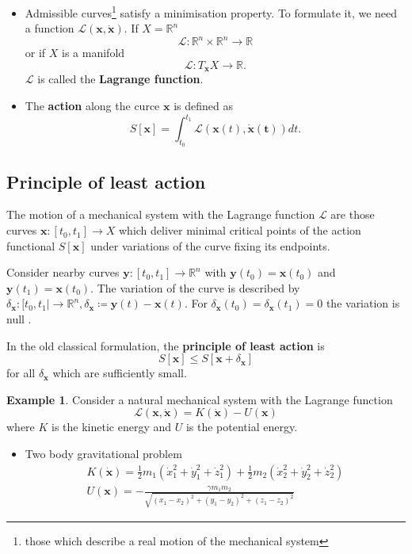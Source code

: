 \documentclass[hidelinks,a4paper, 11pt]{article}
\theoremstyle{plain}
\theoremstyle{break}
\theoremstyle{plain}
\theoremstyle{definition}
\newtheorem*{example}{Example}
\begin{document}
{\begin{itemize}
	\item Admissible curves\footnote{those which describe a real motion of the mechanical system} satisfy a minimisation  property. To formulate it, we need a function $\mathcal L({\mathbf x, \mathbf{\dot x}})$. If $X= \mathbb R^n$
	\[
		\mathcal L: \mathbb R^n \times \mathbb R^n \to \mathbb R 
	\]
	or if $X$ is a manifold
	\[
		\mathcal L: T_{\mathbf x}X \to \mathbb R.
	\]
	$\mathcal L$ is called the \textbf{Lagrange function}.
	
	\item The \textbf{action} along the curce $\mathbf{x}$ is defined as 
	\[
		S[\mathbf x] = \int^{t_1}_{t_0} \mathcal L(\mathbf x(t), \mathbf{\dot x(t)}) dt.
	\]
\end{itemize}

\subsection{Principle of least action}

The motion of a mechanical system with the Lagrange function $\mathcal L$ are those curves $\mathbf x: [t_0,t_1] \to X$ which deliver minimal critical points of the action functional $S[\mathbf x]$ under variations of the curve fixing its endpoints. 

Consider nearby curves $\mathbf y : [t_0, t_1] \to \mathbb R^n$ with $\mathbf y(t_0) = \mathbf x(t_0)$ and $\mathbf y(t_1)= \mathbf x(t_0)$. The variation of the curve is described by $\delta_{\mathbf x}: [t_0,t_1| \to \mathbb R^n, \delta_{\mathbf x} \coloneqq \mathbf y(t) - \mathbf x(t)$. For $\delta_{\mathbf x}(t_0)=\delta_{\mathbf x}(t_1) = 0$ the variation is null .

In the old classical formulation, the \textbf{principle of least action} is 
\[
	S[\mathbf x] \leq S[\mathbf x + \delta_{\mathbf x}]
\]
for all $\delta_{\mathbf x}$ which are sufficiently small.

\begin{example}
	Consider a natural mechanical system with the Lagrange function
	\[
		\mathcal L(\mathbf x, \mathbf{\dot x}) = K(\mathbf{\dot x}) - U(\mathbf x)
	\]	
	where $K$ is the kinetic energy and $U$ is the potential energy.
	
	\begin{itemize}
		\item Two body gravitational problem
		\begin{align*}
			K(\mathbf{\dot x}) = \frac{1}{2}m_1(\dot x_1^2+\dot y_1^2+\dot z_1^2) + \frac{1}{2}m_2(\dot x_2^2 + \dot y_2^2 + \dot z_2^2) \\
			U(\mathbf x) = - \frac{\gamma m_1m_2}{\sqrt{(x_1-x_2)^2 + (y_1-y_2)^2 + (z_1-z_2)^2}}
		\end{align*}
		

\end{itemize}
\end{example}}
\end{document}
